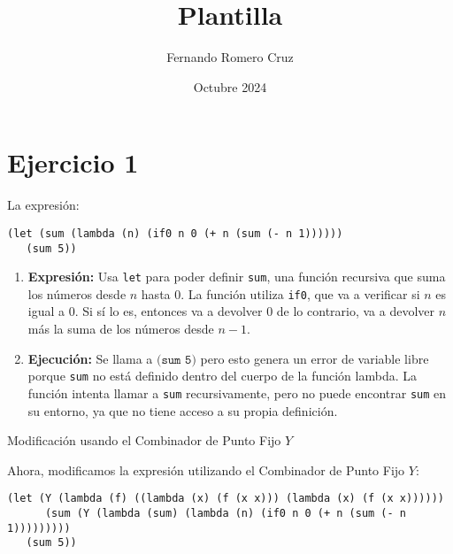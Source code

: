 \documentclass{article}
\title{Plantilla}
\author{Fernando Romero Cruz}
\date{Octubre 2024}
\begin{document}
\maketitle

\section*{Ejercicio 1}

La expresión:

\begin{verbatim}
(let (sum (lambda (n) (if0 n 0 (+ n (sum (- n 1))))))
   (sum 5))
\end{verbatim}

\begin{enumerate}
    \item \textbf{Expresión:} 
    Usa \texttt{let} para poder definir \texttt{sum}, una función recursiva que suma los números desde \( n \) hasta \( 0 \). 
    La función utiliza \texttt{if0}, que va a verificar si \( n \) es igual a \( 0 \). Si sí lo es, entonces va a  devolver \( 0 \) de lo contrario, va a devolver \( n \) más la suma de los números desde \( n-1 \).

    \item \textbf{Ejecución:}
    Se llama a \( \texttt{(sum 5)} \) pero esto genera un error de variable libre porque \texttt{sum} no está definido dentro del cuerpo de la función lambda. 
    La función intenta llamar a \texttt{sum} recursivamente, pero no puede encontrar \texttt{sum} en su entorno, ya que no tiene acceso a su propia definición.
\end{enumerate}

Modificación usando el Combinador de Punto Fijo \( Y \)

Ahora, modificamos la expresión utilizando el Combinador de Punto Fijo \( Y \):

\begin{verbatim}
(let (Y (lambda (f) ((lambda (x) (f (x x))) (lambda (x) (f (x x))))))
      (sum (Y (lambda (sum) (lambda (n) (if0 n 0 (+ n (sum (- n 1)))))))))
   (sum 5))
\end{verbatim}
\end{document}
